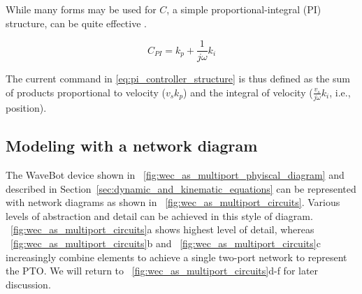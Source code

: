 \documentclass[lettersize,journal]{IEEEtran}
\begin{document}
\noindent{}While many forms may be used for $C$, a simple proportional-integral (PI) structure, can be quite effective \cite{Coe2020a}.

\begin{equation}
        C_{PI} = k_p + \frac{1}{j \omega} k_i 
        \label{eq:pi_controller_structure}
\end{equation}

\noindent{}The current command in \eqref{eq:pi_controller_structure} is thus defined as the sum of products proportional to velocity ($v_s k_p$) and the integral of velocity ($\frac{v_s}{j \omega} k_i$, i.e., position).

\subsection{Modeling with a network diagram}\label{sec:modeling_with_a_network_diagram}

The WaveBot device shown in \figurename~\ref{fig:wec_as_multiport_phyiscal_diagram} and described in Section~\ref{sec:dynamic_and_kinematic_equations} can be represented with network diagrams as shown in \figurename~\ref{fig:wec_as_multiport_circuits}.
Various levels of abstraction and detail can be achieved in this style of diagram.
\figurename~\ref{fig:wec_as_multiport_circuits}a shows highest level of detail, whereas \figurename~\ref{fig:wec_as_multiport_circuits}b and \figurename~\ref{fig:wec_as_multiport_circuits}c increasingly combine elements to achieve a single two-port network to represent the PTO.
We will return to \figurename~\ref{fig:wec_as_multiport_circuits}d-f for later discussion.
\end{document}
